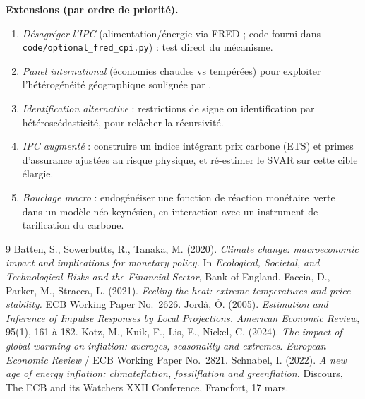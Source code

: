 \documentclass[11pt,a4paper]{article}
\providecommand{\og}{\guillemotleft\,}
\providecommand{\fg}{\,\guillemotright}
\begin{document}
\textbf{Extensions (par ordre de priorité).}
\begin{enumerate}[leftmargin=1.5em,itemsep=1pt,topsep=2pt]
\item \emph{Désagréger l'IPC} (alimentation/énergie via FRED ; code fourni dans
      \texttt{code/optional\_fred\_cpi.py}) : test direct du mécanisme.
\item \emph{Panel international} (économies chaudes vs tempérées) pour exploiter
      l'hétérogénéité géographique soulignée par \citet{kotz2024}.
\item \emph{Identification alternative} : restrictions de signe ou identification par
      hétéroscédasticité, pour relâcher la récursivité.
\item \emph{IPC augmenté} : construire un indice intégrant prix carbone (ETS) et primes
      d'assurance ajustées au risque physique, et ré-estimer le SVAR sur cette cible
      élargie.
\item \emph{Bouclage macro} : endogénéiser une fonction de réaction monétaire \og verte \fg{}
      dans un modèle néo-keynésien, en interaction avec un instrument de tarification du
      carbone.
\end{enumerate}

\small
\begin{thebibliography}{9}
 Batten, S., Sowerbutts, R., Tanaka, M. (2020).
\emph{Climate change: macroeconomic impact and implications for monetary policy.} In
\textit{Ecological, Societal, and Technological Risks and the Financial Sector}, Bank of England.
 Faccia, D., Parker, M., Stracca, L. (2021).
\emph{Feeling the heat: extreme temperatures and price stability.} ECB Working Paper No.~2626.
 Jordà, Ò. (2005). \emph{Estimation and Inference of Impulse
Responses by Local Projections.} \textit{American Economic Review}, 95(1), 161 à 182.
 Kotz, M., Kuik, F., Lis, E., Nickel, C. (2024).
\emph{The impact of global warming on inflation: averages, seasonality and extremes.}
\textit{European Economic Review} / ECB Working Paper No.~2821.
 Schnabel, I. (2022). \emph{A new age of energy
inflation: climateflation, fossilflation and greenflation.} Discours, The ECB and its
Watchers XXII Conference, Francfort, 17 mars.
\end{thebibliography}
\normalsize

\appendix
\end{document}
